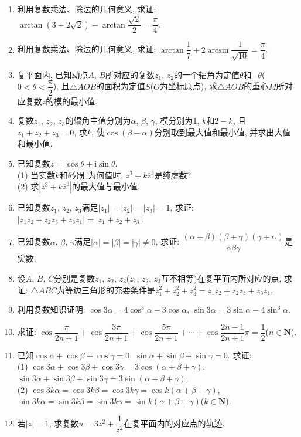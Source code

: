 \documentclass[10pt,a4paper]{article}
\begin{document}
\begin{enumerate}[1.]
\item 利用复数乘法、除法的几何意义, 求证: $\arctan (3+2\sqrt 2)-\arctan \dfrac{\sqrt 2}2=\dfrac{\pi }4$.
\item 利用复数乘法、除法的几何意义, 求证: $\arctan \dfrac 17+2\arcsin \dfrac 1{\sqrt {10}}=\dfrac{\pi }4$.
\item 复平面内, 已知动点$A$, $B$所对应的复数$z_1$, $z_2$的一个辐角为定值$\theta$和$-\theta$($0<\theta <\dfrac{\pi }2$), 且$\triangle AOB$的面积为定值$S$($O$为坐标原点), 求$\triangle AOB$的重心$M$所对应复数$z$的模的最小值.
\item 复数$z_1$, $z_2$, $z_3$的辐角主值分别为$\alpha$, $\beta$, $\gamma$, 模分别为1, $k$和$2-k$, 且$z_1+z_2+z_3=0$, 求$k$, 使$\cos (\beta -\alpha)$分别取到最大值和最小值, 并求出大值和最小值.
\item 已知复数$z=\cos \theta +\mathrm{i}\sin \theta$.\\
(1) 当实数$k$和$\theta$分别为何值时, $z^3+k\overline z^3$是纯虚数?\\
(2) 求$|z^3+k\overline z^3|$的最大值与最小值.
\item 已知复数$z_1$, $z_2$, $z_3$满足$|z_1|=|z_2|=|z_3|=1$, 求证: $|z_1z_2+z_2z_3+z_3z_1|=|z_1+z_2+z_3|$.
\item 已知复数$\alpha$, $\beta$, $\gamma$满足$|\alpha|=|\beta|=|\gamma|\ne 0$, 求证: $\dfrac{(\alpha +\beta)(\beta +\gamma)(\gamma +\alpha)}{\alpha \beta \gamma }$是实数.
\item 设$A$, $B$, $C$分别是复数$z_1$, $z_2$, $z_3$($z_1$, $z_2$, $z_3$互不相等)在复平面内所对应的点, 求证: $\triangle ABC$为等边三角形的充要条件是$z_1^2+z_2^2+z_3^2=z_1z_2+z_2z_3+z_3z_1$.
\item 利用复数知识证明: $\cos 3\alpha =4\cos ^3\alpha -3\cos \alpha$, $\sin 3\alpha =3\sin \alpha -4\sin ^3\alpha$.
\item 求证: $\cos \dfrac{\pi }{2n+1}+\cos \dfrac{3\pi }{2n+1}+\cos \dfrac{5\pi }{2n+1}+\cdots +\cos \dfrac{2n-1}{2n+1}\pi =\dfrac 12$($n\in \mathbf{N}$).
\item 已知$\cos \alpha +\cos \beta +\cos \gamma =0$, $\sin \alpha +\sin \beta +\sin \gamma =0$. 求证:\\
(1) $\cos 3\alpha +\cos 3\beta +\cos 3\gamma =3\cos (\alpha +\beta +\gamma)$, $\sin 3\alpha +\sin 3\beta +\sin 3\gamma =3\sin (\alpha +\beta +\gamma)$;\\
(2) $\cos 3k\alpha =\cos 3k\beta =\cos 3k\gamma =\cos k(\alpha +\beta +\gamma)$, $\sin 3k\alpha =\sin 3k\beta =\sin 3k\gamma =\sin k(\alpha +\beta +\gamma)$($k\in \mathbf{N}$).
\item 若$|z|=1$, 求复数$u=3z^2+\dfrac 1{z^2}$在复平面内的对应点的轨迹.

\end{enumerate}
\end{document}
